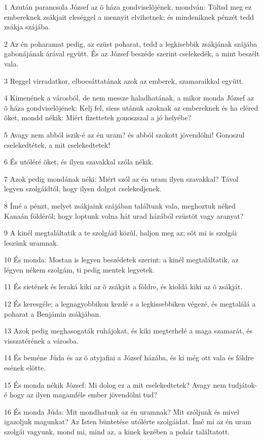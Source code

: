 \par 1 Azután parancsola József az õ háza gondviselõjének, mondván: Töltsd meg ez embereknek zsákjait eleséggel a mennyit elvihetnek; és mindeniknek pénzét tedd zsákja szájába.
\par 2 Az én poharamat pedig, az ezüst poharat, tedd a legkisebbik zsákjának szájába gabonájának árával együtt. És az József beszéde szerint cselekedék, a mint beszélt vala.
\par 3 Reggel virradatkor, elbocsáttatának azok az emberek, szamaraikkal együtt.
\par 4 Kimenének a városból, de nem messze haladhatának, a mikor monda József az õ háza gondviselõjének: Kelj fel, siess utánuk azoknak az embereknek és ha eléred õket, mondd nékik: Miért fizettetek gonoszszal a jó helyébe?
\par 5 Avagy nem abból iszik-é az én uram? és abból szokott jövendölni! Gonoszul cselekedtétek, a mit cselekedtetek!
\par 6 És utóléré õket, és ilyen szavakkal szóla nékik.
\par 7 Azok pedig mondának néki: Miért szól az én uram ilyen szavakkal? Távol legyen szolgáidtól, hogy ilyen dolgot cselekedjenek.
\par 8 Ímé a pénzt, melyet zsákjaink szájában találtunk vala, meghoztuk néked Kanaán földérõl; hogy loptunk volna hát urad házából ezüstöt vagy aranyat?
\par 9 A kinél megtaláltatik a te szolgáid közûl, haljon meg az; sõt mi is szolgái leszünk uramnak.
\par 10 És monda: Mostan is legyen beszédetek szerint: a kinél megtaláltatik, az légyen nékem szolgám, ti pedig mentek legyetek.
\par 11 És sietének és leraká kiki az õ zsákját a földre, és kioldá kiki az õ zsákját.
\par 12 És keresgéle; a legnagyobbikon kezdé s a legkissebbiken végezé, és megtalálá a poharat a Benjámin zsákjában.
\par 13 Azok pedig meghasogaták ruhájokat, és kiki megterhelé a maga szamarát, és visszatérének a városba.
\par 14 És beméne Júda és az õ atyjafiai a József házába, és ki még ott vala és földre esének elõtte.
\par 15 És monda nékik József: Mi dolog ez a mit cselekedtetek? Avagy nem tudjátok-é hogy az ilyen magamféle ember jövendölni tud?
\par 16 És monda Júda: Mit mondhatunk az én uramnak? Mit szóljunk és mivel igazoljuk magunkat? Az Isten büntetése utólérte szolgáidat. Ímé mi az én uram szolgái vagyunk, mond mi, mind az, a kinek kezében a pohár találtatott.
